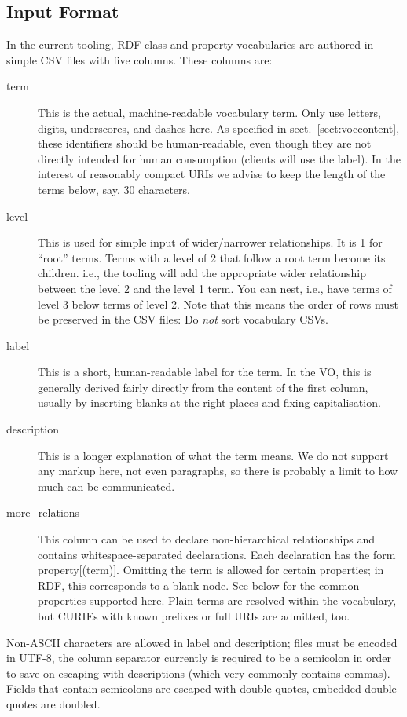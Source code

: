 \documentclass[11pt,a4paper]{ivoa}
\begin{document}
\subsection{Input Format}

In the current tooling, RDF class and property 
vocabularies are authored in simple CSV files
with five columns.  These columns are:

\begin{description}
\item[term]
  This is the actual, machine-readable vocabulary term.  Only use
  letters, digits, underscores, and dashes here.  As specified in
  sect.~\ref{sect:voccontent}, these identifiers should be
  human-readable, even though they are not directly intended for human
  consumption (clients will use the label).  In the interest of
  reasonably compact URIs we advise to keep the length of the
  terms below, say, 30 characters.
\item[level]
  This is used for simple input of wider/narrower relationships.
  It is 1 for ``root'' terms.  Terms with a level of 2 that follow a
  root term become its children. i.e., the tooling will add the
  appropriate wider relationship between the level 2 and the level 1
  term.  You can nest, i.e., have
  terms of level 3 below terms of level 2.  Note that this means the
  order of rows must be preserved in the CSV files: Do \emph{not} sort
  vocabulary CSVs.
\item[label]
  This is a short, human-readable label for the term.  In the VO, this
  is generally derived fairly directly from the content of the first
  column, usually by
  inserting blanks at the right places and fixing capitalisation.
\item[description]
  This is a longer explanation of what the term means.  We do not
  support any markup here, not even paragraphs, so there is probably a
  limit to how much can be communicated.
\item[more\_relations] 
  This column can be used to declare non-hierarchical relationships
  and contains whitespace-separated declarations.  Each declaration has
  the form property[(term)].  Omitting the term is allowed for certain
  properties; in RDF, this corresponds to a blank node.  See below for 
  the common properties supported here.  Plain terms are resolved 
  within the vocabulary, but CURIEs with known prefixes or full URIs are
  admitted, too.
\end{description}

Non-ASCII characters are allowed in label and description; files must be
encoded in UTF-8, the column separator currently is required to be a
semicolon in order to save on escaping with descriptions (which very
commonly contains commas).  Fields that contain semicolons are escaped
with double quotes, embedded double quotes are doubled.
\end{document}
